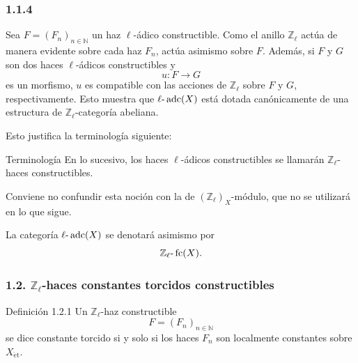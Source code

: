 \subsubsection*{1.1.4}
Sea \(F=(F_n)_{n\in\mathbb N}\) un haz \(\ell\)-ádico constructible. Como el anillo \(\mathbb Z_\ell\) actúa de manera evidente sobre cada haz \(F_n\), actúa asimismo sobre \(F\). Además, si \(F\) y \(G\) son dos haces \(\ell\)-ádicos constructibles y
\[
u:F\longrightarrow G
\]
es un morfismo, \(u\) es compatible con las acciones de \(\mathbb Z_\ell\) sobre \(F\) y \(G\), respectivamente. Esto muestra que \(\ell\text{-}\operatorname{adc}(X)\) está dotada canónicamente de una estructura de \(\mathbb Z_\ell\)-categoría abeliana.

Esto justifica la terminología siguiente:

\begin{statement}{Terminología}
En lo sucesivo, los haces \(\ell\)-ádicos constructibles se llamarán \(\mathbb Z_\ell\)-haces constructibles.
\end{statement}

Conviene no confundir esta noción con la de \((\mathbb Z_\ell)_X\)-módulo, que no se utilizará en lo que sigue.

La categoría \(\ell\text{-}\operatorname{adc}(X)\) se denotará asimismo por
\[
\mathbb Z_\ell\text{-}\operatorname{fc}(X).
\]

\subsubsection*{1.2. \(\mathbb Z_\ell\)-haces constantes torcidos constructibles}

\begin{statement}{Definición 1.2.1}
Un \(\mathbb Z_\ell\)-haz constructible
\[
F=(F_n)_{n\in\mathbb N}
\]
se dice constante torcido si y solo si los haces \(F_n\) son localmente constantes sobre \(X_{\mathrm{\acute et}}\).
\end{statement}
